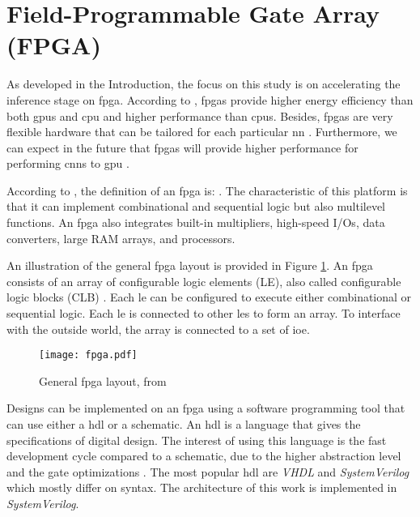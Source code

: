 \section{Field-Programmable Gate Array (FPGA)} \label{sec:fpga}
%
%
As developed in the Introduction, the focus on this study is on accelerating the inference stage on \acrshort{fpga}. According to \textcite{mittal_survey_2015}, \acrshort{fpga}s provide higher energy efficiency than both \acrshort{gpu}s and \acrshort{cpu} and higher performance than \acrshort{cpu}s. Besides, \acrshort{fpga}s are very flexible hardware that can be tailored for each particular \acrshort{nn} \cite{vestias_fast_2019}. Furthermore, we can expect in the future that \acrshort{fpga}s will provide higher performance for performing \acrshort{cnn}s to \acrshort{gpu} \cite{nurvitadhi_can_2017}.

According to \textcite{harris_digital_2015}, the definition of an \acrshort{fpga} is: . The characteristic of this platform is that it can implement combinational and sequential logic but also multilevel functions. An \acrshort{fpga} also integrates built-in multipliers, high-speed I/Os, data converters, large RAM arrays, and processors.

An illustration of the general \acrshort{fpga} layout is provided in Figure \ref{fig:fpga}. An \acrshort{fpga} consists of an array of configurable logic elements (LE), also called configurable logic blocks (CLB) \cite{harris_digital_2015}. Each \acrshort{le} can be configured to execute either combinational or sequential logic. Each \acrshort{le} is connected to other \acrshort{le}s to form an array. To interface with the outside world, the array is connected to a set of \acrfull{ioe}.
%
\begin{figure}[H]
    \centering
    \texttt{[image: fpga.pdf]}
    \caption{General \acrshort{fpga} layout, from \cite{harris_digital_2015}}
    \label{fig:fpga}
\end{figure}

Designs can be implemented on an \acrshort{fpga} using a software programming tool that can use either a \acrfull{hdl} or a schematic. An \acrshort{hdl} is a language that gives the specifications of digital design. The interest of using this language is the fast development cycle compared to a schematic, due to the higher abstraction level and the gate optimizations \cite{harris_digital_2015}. The most popular \acrshort{hdl} are \textit{VHDL} and \textit{SystemVerilog} which mostly differ on syntax. The architecture of this work is implemented in \textit{SystemVerilog}. 

